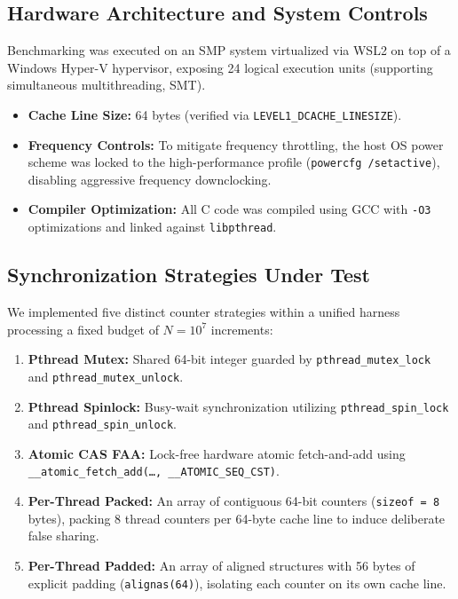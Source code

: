 \documentclass[conference]{IEEEtran}
\begin{document}
\subsection{Hardware Architecture and System Controls}
Benchmarking was executed on an SMP system virtualized via WSL2 on top of a Windows Hyper-V hypervisor, exposing 24 logical execution units (supporting simultaneous multithreading, SMT). 
\begin{itemize}
    \item \textbf{Cache Line Size:} 64 bytes (verified via \texttt{LEVEL1\_DCACHE\_LINESIZE}).
    \item \textbf{Frequency Controls:} To mitigate frequency throttling, the host OS power scheme was locked to the high-performance profile (\texttt{powercfg /setactive}), disabling aggressive frequency downclocking.
    \item \textbf{Compiler Optimization:} All C code was compiled using GCC with \texttt{-O3} optimizations and linked against \texttt{libpthread}.
\end{itemize}

\subsection{Synchronization Strategies Under Test}
We implemented five distinct counter strategies within a unified harness processing a fixed budget of $N = 10^7$ increments:
\begin{enumerate}
    \item \textbf{Pthread Mutex:} Shared 64-bit integer guarded by \texttt{pthread\_mutex\_lock} and \texttt{pthread\_mutex\_unlock}.
    \item \textbf{Pthread Spinlock:} Busy-wait synchronization utilizing \texttt{pthread\_spin\_lock} and \texttt{pthread\_spin\_unlock}.
    \item \textbf{Atomic CAS FAA:} Lock-free hardware atomic fetch-and-add using \texttt{\_\_atomic\_fetch\_add(\dots, \_\_ATOMIC\_SEQ\_CST)}.
    \item \textbf{Per-Thread Packed:} An array of contiguous 64-bit counters (\texttt{sizeof = 8} bytes), packing 8 thread counters per 64-byte cache line to induce deliberate false sharing.
    \item \textbf{Per-Thread Padded:} An array of aligned structures with 56 bytes of explicit padding (\texttt{alignas(64)}), isolating each counter on its own cache line.
\end{enumerate}
\end{document}
